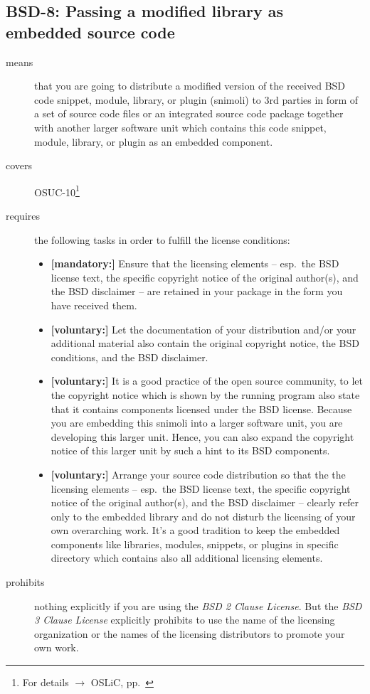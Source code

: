 \subsection{BSD-8: Passing a modified library as embedded source code}
\label{OSUC-10-BSD}
\begin{description}
\item[means] that you are going to distribute a modified version of the received
BSD code snippet, module, library, or plugin (snimoli) to 3rd parties in form
of a set of source code files or an integrated source code package together with
another larger software unit which contains this code snippet, module, library,
or plugin as an embedded component.
\item[covers] OSUC-10\footnote{For details $\rightarrow$ OSLiC, pp.\ \pageref{OSUC-10-DEF}}
\item[requires] the following tasks in order to fulfill the license conditions:
\begin{itemize}
  \item \textbf{[mandatory:]} Ensure that the licensing elements -- esp.\ the
  BSD license text, the specific copyright notice of the original author(s), and
  the BSD disclaimer -- are retained in your package in the form you have
  received them.
  \item \textbf{[voluntary:]} Let the documentation of your distribution
  and/or your additional material also contain the original copyright notice, the
  BSD conditions, and the BSD disclaimer.
 \item \textbf{[voluntary:]} It is a good practice of the open source
  community, to let the copyright notice which is shown by the running program
  also state that it contains components licensed under the BSD license. Because
  you are embedding this snimoli into a larger software unit, you are
  developing this larger unit. Hence, you can also expand the copyright notice
  of this larger unit by such a hint to its BSD components.
  
  \item \textbf{[voluntary:]} Arrange your source code distribution so that the
  the licensing elements -- esp.\ the BSD license text, the specific copyright
  notice of the original author(s), and the BSD disclaimer -- clearly refer
  only to the embedded library and do not disturb the licensing of your own
  overarching work. It's a good tradition to keep the embedded components like
  libraries, modules, snippets, or plugins in specific directory which contains
  also all additional licensing elements.
  
\end{itemize}

\item[prohibits] nothing explicitly if you are using the \emph{BSD 2 Clause
License}. But the \emph{BSD 3 Clause License} explicitly prohibits to use the
name of the licensing organization or the names of the licensing distributors to
promote your own work.

\end{description}


